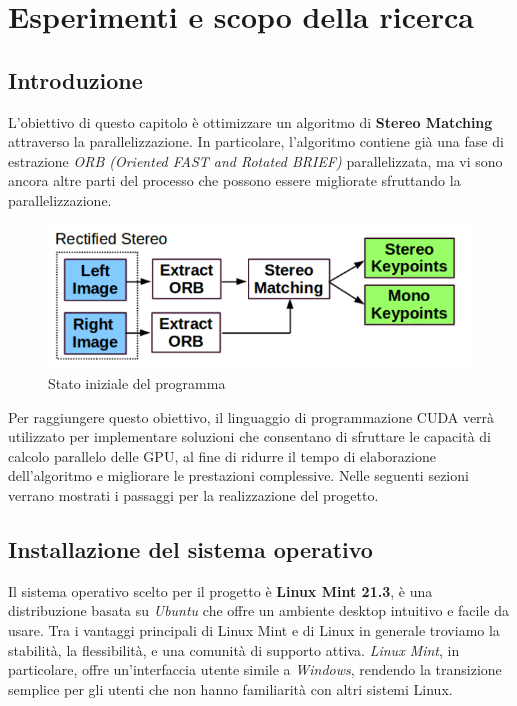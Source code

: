 \documentclass[12pt,a4paper]{report}
\begin{document}
\chapter{Esperimenti e scopo della ricerca}

\section{Introduzione}

L'obiettivo di questo capitolo è ottimizzare un algoritmo di \textbf{Stereo Matching} attraverso la parallelizzazione. In particolare, l'algoritmo contiene già una fase di estrazione \textit{ORB (Oriented FAST and Rotated BRIEF)} parallelizzata, ma vi sono ancora altre parti del processo che possono essere migliorate sfruttando la parallelizzazione.

\begin{figure}[h]
    \centering
    \includegraphics[width=0.7\linewidth]{img/start_point_opt.png}
    \caption{Stato iniziale del programma \cite{ORB_SLAM_2}}
\end{figure}


Per raggiungere questo obiettivo, il linguaggio di programmazione CUDA verrà utilizzato per implementare soluzioni che consentano di sfruttare le capacità di calcolo parallelo delle GPU, al fine di ridurre il tempo di elaborazione dell'algoritmo e migliorare le prestazioni complessive.
Nelle seguenti sezioni verrano mostrati i passaggi per la realizzazione del progetto.


\section{Installazione del sistema operativo}

Il sistema operativo scelto per il progetto è \textbf{Linux Mint 21.3}, è una distribuzione basata su \textit{Ubuntu} che offre un ambiente desktop intuitivo e facile da usare. Tra i vantaggi principali di Linux Mint e di Linux in generale troviamo la stabilità, la flessibilità, e una comunità di supporto attiva. \textit{Linux Mint}, in particolare, offre un'interfaccia utente simile a \textit{Windows}, rendendo la transizione semplice per gli utenti che non hanno familiarità con altri sistemi Linux.
\end{document}
